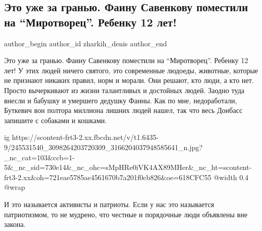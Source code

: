  
 
 
 
 
 
\subsection{Это уже за гранью. Фаину Савенкову поместили на \enquote{Миротворец}. Ребенку 12 лет!}
\label{sec:13_10_2021.fb.zharkih_denis.2.savenkova_mirotvorec}
 
\ifcmt
 author_begin
   author_id zharkih_denis
 author_end
\fi

Это уже за гранью. Фаину Савенкову поместили на \enquote{Миротворец}. Ребенку 12 лет! У
этих людей ничего святого, это современные людоеды, животные, которые не
признают никаких правил, норм и морали. Они решают, кто люди, а кто нет. Просто
вычеркивают из жизни талантливых и достойных людей. Заодно туда внесли и
бабушку и умершего дедушку Фаины. Как по мне, недоработали, Буткевич вон
полтора миллиона лишних людей нашел, так что весь Донбасс запишите с собаками и
кошками.

\ifcmt
  ig https://scontent-frt3-2.xx.fbcdn.net/v/t1.6435-9/245531540_3098264203720309_3166204037948585641_n.jpg?_nc_cat=103&ccb=1-5&_nc_sid=730e14&_nc_ohc=sMpHRe0iVK4AX89MHer&_nc_ht=scontent-frt3-2.xx&oh=721eae5785ae4561670b7a201f0cb826&oe=618CFC55
  @width 0.4
  @wrap \parpic[r]
\fi

И это называется активисты и патриоты. Если у нас это называется патриотизмом,
то не мудрено, что честные и порядочные люди объявлены вне закона.

